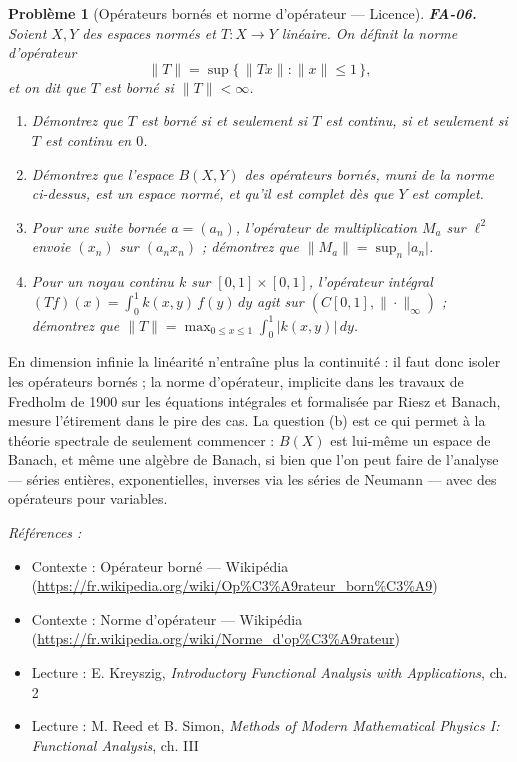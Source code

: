 \documentclass[11pt]{article}
\newtheorem{problem}{Problème}
\newenvironment{refs}{\par\small\noindent\emph{Références :}\begin{itemize}\setlength\itemsep{0pt}}{\end{itemize}\normalsize}
\begin{document}
\bigskip

\begin{problem}[{Opérateurs bornés et norme d'opérateur --- Licence}]
\textbf{FA-06.} Soient $ X, Y $ des espaces normés et $ T : X \to Y $ linéaire. On définit la
norme d'opérateur
\[ \|T\| = \sup\{\, \|Tx\| : \|x\| \le 1 \,\}, \]
et on dit que $ T $ est borné si $ \|T\| < \infty $.
\begin{enumerate}
\item[(a)] Démontrez que $ T $ est borné si et seulement si $ T $ est continu, si et seulement si
$ T $ est continu en $ 0 $.
\item[(b)] Démontrez que l'espace $ B(X, Y) $ des opérateurs bornés, muni de la norme ci-dessus, est un
espace normé, et qu'il est complet dès que $ Y $ est complet.
\item[(c)] Pour une suite bornée $ a = (a_n) $, l'opérateur de multiplication $ M_a $ sur $ \ell^2 $
envoie $ (x_n) $ sur $ (a_n x_n) $ ; démontrez que $ \|M_a\| = \sup_n |a_n| $.
\item[(d)] Pour un noyau continu $ k $ sur $ [0,1] \times [0,1] $, l'opérateur intégral
$ (Tf)(x) = \int_0^1 k(x,y)\,f(y)\,dy $ agit sur $ (C[0,1], \|\cdot\|_\infty) $ ; démontrez que
$ \|T\| = \max_{0 \le x \le 1} \int_0^1 |k(x,y)|\,dy $.
\end{enumerate}

\end{problem}

\noindent En dimension infinie la linéarité n'entraîne plus la continuité : il faut donc isoler
les opérateurs bornés ; la norme d'opérateur, implicite dans les travaux de Fredholm de 1900 sur les
équations intégrales et formalisée par Riesz et Banach, mesure l'étirement dans le pire des cas. La
question (b) est ce qui permet à la théorie spectrale de seulement commencer : $ B(X) $ est
lui-même un espace de Banach, et même une algèbre de Banach, si bien que l'on peut faire de l'analyse
--- séries entières, exponentielles, inverses via les séries de Neumann --- avec des opérateurs pour
variables.

\begin{refs}
\item Contexte : Opérateur borné --- Wikipédia (\url{https://fr.wikipedia.org/wiki/Op%C3%A9rateur_born%C3%A9})
\item Contexte : Norme d'opérateur --- Wikipédia (\url{https://fr.wikipedia.org/wiki/Norme_d'op%C3%A9rateur})
\item Lecture : E. Kreyszig, \textit{Introductory Functional Analysis with Applications}, ch. 2
\item Lecture : M. Reed et B. Simon, \textit{Methods of Modern Mathematical Physics I: Functional Analysis}, ch. III
\end{refs}
\end{document}
